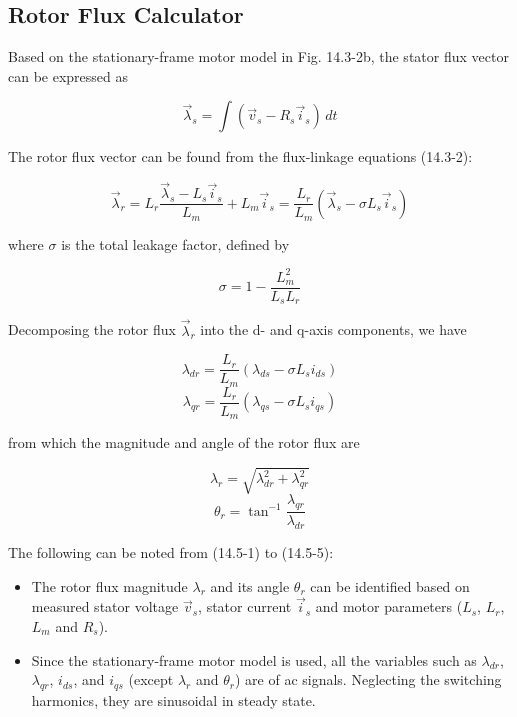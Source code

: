 \documentclass[letterpaper,12pt]{article}
\begin{document}
\subsection{Rotor Flux Calculator}

Based on the stationary-frame motor model in Fig. 14.3-2b, the stator flux vector can be expressed as

\begin{equation}
\vec{\lambda}_s = \int (\vec{v}_s - R_s \vec{i}_s) \, dt \tag{14.5-1}
\end{equation}

The rotor flux vector can be found from the flux-linkage equations (14.3-2):

\begin{equation}
\vec{\lambda}_r = L_r \frac{\vec{\lambda}_s - L_s \vec{i}_s}{L_m} + L_m \vec{i}_s = \frac{L_r}{L_m} (\vec{\lambda}_s - \sigma L_s \vec{i}_s) \tag{14.5-2}
\end{equation}

where $\sigma$ is the total leakage factor, defined by

\begin{equation}
\sigma = 1 - \frac{L_m^2}{L_s L_r} \tag{14.5-3}
\end{equation}

Decomposing the rotor flux $\vec{\lambda}_r$ into the d- and q-axis components, we have

\begin{equation}
\lambda_{dr} = \frac{L_r}{L_m} (\lambda_{ds} - \sigma L_s i_{ds}) \tag{14.5-4}
\end{equation}
\begin{equation}
\lambda_{qr} = \frac{L_r}{L_m} (\lambda_{qs} - \sigma L_s i_{qs}) \tag{14.5-4}
\end{equation}

from which the magnitude and angle of the rotor flux are

\begin{equation}
\lambda_r = \sqrt{\lambda_{dr}^2 + \lambda_{qr}^2} \tag{14.5-5}
\end{equation}
\begin{equation}
\theta_r = \tan^{-1} \frac{\lambda_{qr}}{\lambda_{dr}} \tag{14.5-5}
\end{equation}

The following can be noted from (14.5-1) to (14.5-5):

\begin{itemize}
    \item The rotor flux magnitude $\lambda_r$ and its angle $\theta_r$ can be identified based on measured stator voltage $\vec{v}_s$, stator current $\vec{i}_s$ and motor parameters ($L_s$, $L_r$, $L_m$ and $R_s$).
    \item Since the stationary-frame motor model is used, all the variables such as $\lambda_{dr}$, $\lambda_{qr}$, $i_{ds}$, and $i_{qs}$ (except $\lambda_r$ and $\theta_r$) are of ac signals. Neglecting the switching harmonics, they are sinusoidal in steady state.
\end{itemize}
\end{document}
